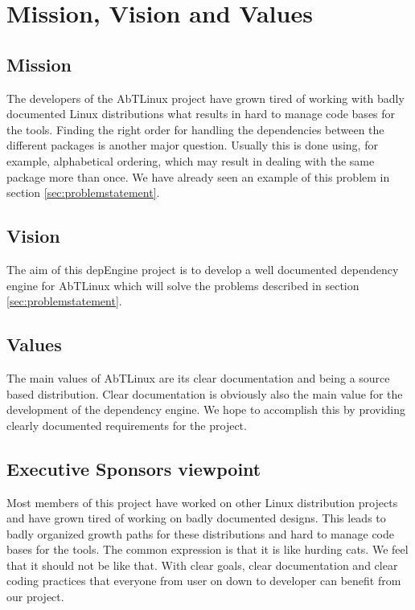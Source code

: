 \section{Mission, Vision and Values}

\subsection{Mission}
The developers of the AbTLinux project have grown tired of working with badly documented Linux distributions what results in hard to manage code bases for the tools. Finding the right order for handling the dependencies between the different packages is another major question. Usually this is done using, for example, alphabetical ordering, which may result in dealing with the same package more than once. We have already seen an example of this problem in section \ref{sec:problemstatement}.

\subsection{Vision}
The aim of this depEngine project is to develop a well documented dependency engine for AbTLinux which will solve the problems described in section \ref{sec:problemstatement}.

\subsection{Values}
The main values of AbTLinux are its clear documentation and being a source based distribution. Clear documentation is obviously also the main value for the development of the dependency engine. We hope to accomplish this by providing clearly documented requirements for the project.

\subsection{Executive Sponsors viewpoint}
Most members of this project have worked on other Linux distribution projects and have grown tired of working on badly documented designs. This leads to badly organized growth paths for these distributions and hard to manage code bases for the tools. The common expression is that it is like hurding cats. We feel that it should not be like that. With clear goals, clear documentation and clear coding practices that
everyone from user on down to developer can benefit from our project.